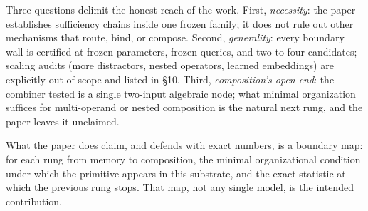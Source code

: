 Three questions delimit the honest reach of the work. First,
\emph{necessity}: the paper establishes sufficiency chains inside one
frozen family; it does not rule out other mechanisms that route, bind, or
compose. Second, \emph{generality}: every boundary wall is certified at
frozen parameters, frozen queries, and two to four candidates; scaling
audits (more distractors, nested operators, learned embeddings) are
explicitly out of scope and listed in §10. Third, \emph{composition's
open end}: the combiner tested is a single two-input algebraic node; what
minimal organization suffices for multi-operand or nested composition is
the natural next rung, and the paper leaves it unclaimed.

What the paper does claim, and defends with exact numbers, is a boundary
map: for each rung from memory to composition, the minimal organizational
condition under which the primitive appears in this substrate, and the
exact statistic at which the previous rung stops. That map, not any single
model, is the intended contribution.
